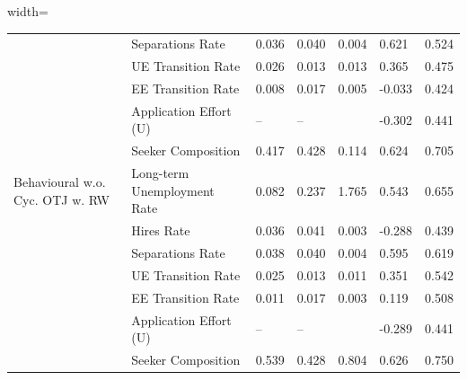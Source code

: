 \begin{adjustbox}{width=\textwidth}
\begin{tabular}{lllllll}
\cellcolor{modelBehaviouralwCycOTJwRW!25} & Separations Rate & 0.036 & 0.040 & 0.004 & \cellcolor{green!25}0.621 & 0.524 \\
\cellcolor{modelBehaviouralwCycOTJwRW!25} & UE Transition Rate & 0.026 & 0.013 & 0.013 & \cellcolor{yellow!25}0.365 & 0.475 \\
\cellcolor{modelBehaviouralwCycOTJwRW!25} & EE Transition Rate & 0.008 & 0.017 & 0.005 & \cellcolor{red!25}-0.033 & 0.424 \\
\cellcolor{modelBehaviouralwCycOTJwRW!25} & Application Effort (U) & -- & -- &  & \cellcolor{orange!25}-0.302 & 0.441 \\
\cellcolor{modelBehaviouralwCycOTJwRW!25} & Seeker Composition & 0.417 & 0.428 & 0.114 & \cellcolor{green!40!yellow!25}0.624 & 0.705 \\
\cellcolor{modelBehaviouralwoCycOTJwRW!25}Behavioural w.o. Cyc. OTJ w. RW & Long-term Unemployment Rate & 0.082 & 0.237 & 1.765 & \cellcolor{green!70!yellow!25}0.543 & 0.655 \\
\cellcolor{modelBehaviouralwoCycOTJwRW!25} & Hires Rate & 0.036 & 0.041 & 0.003 & \cellcolor{yellow!25}-0.288 & 0.439 \\
\cellcolor{modelBehaviouralwoCycOTJwRW!25} & Separations Rate & 0.038 & 0.040 & 0.004 & \cellcolor{green!70!yellow!25}0.595 & 0.619 \\
\cellcolor{modelBehaviouralwoCycOTJwRW!25} & UE Transition Rate & 0.025 & 0.013 & 0.011 & \cellcolor{orange!25}0.351 & 0.542 \\
\cellcolor{modelBehaviouralwoCycOTJwRW!25} & EE Transition Rate & 0.011 & 0.017 & 0.003 & \cellcolor{green!70!yellow!25}0.119 & 0.508 \\
\cellcolor{modelBehaviouralwoCycOTJwRW!25} & Application Effort (U) & -- & -- &  & \cellcolor{yellow!25}-0.289 & 0.441 \\
\cellcolor{modelBehaviouralwoCycOTJwRW!25} & Seeker Composition & 0.539 & 0.428 & 0.804 & \cellcolor{green!70!yellow!25}0.626 & 0.750 \\
\bottomrule
\end{tabular}
\end{adjustbox}
